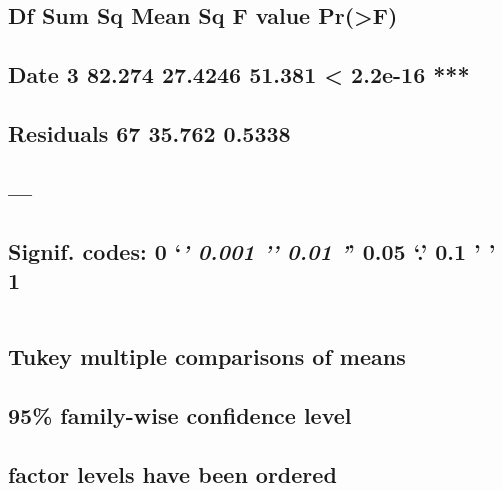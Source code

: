 \documentclass[
]{article}
\begin{document}
\hypertarget{df-sum-sq-mean-sq-f-value-prf}{%
\subsection{Df Sum Sq Mean Sq F value
Pr(\textgreater F)}\label{df-sum-sq-mean-sq-f-value-prf}}

\hypertarget{date-3-82.274-27.4246-51.381-2.2e-16}{%
\subsection{Date 3 82.274 27.4246 51.381 \textless{} 2.2e-16
***}\label{date-3-82.274-27.4246-51.381-2.2e-16}}

\hypertarget{residuals-67-35.762-0.5338}{%
\subsection{Residuals 67 35.762
0.5338}\label{residuals-67-35.762-0.5338}}

\hypertarget{section-18}{%
\subsection{---}\label{section-18}}

\hypertarget{signif.-codes-0-0.001-0.01-0.05-.-0.1-1-1}{%
\subsection{\texorpdfstring{Signif. codes: 0 `\emph{\textbf{' 0.001 '}'
0.01 '}' 0.05 `.' 0.1 ' '
1}{Signif. codes: 0 `\,' 0.001 '\,' 0.01 '\,' 0.05 `.' 0.1 ' ' 1}}\label{signif.-codes-0-0.001-0.01-0.05-.-0.1-1-1}}

\begin{verbatim}
\end{verbatim}

\hypertarget{tukey-multiple-comparisons-of-means}{%
\subsection{Tukey multiple comparisons of
means}\label{tukey-multiple-comparisons-of-means}}

\hypertarget{family-wise-confidence-level}{%
\subsection{95\% family-wise confidence
level}\label{family-wise-confidence-level}}

\hypertarget{factor-levels-have-been-ordered}{%
\subsection{factor levels have been
ordered}\label{factor-levels-have-been-ordered}}
\end{document}
